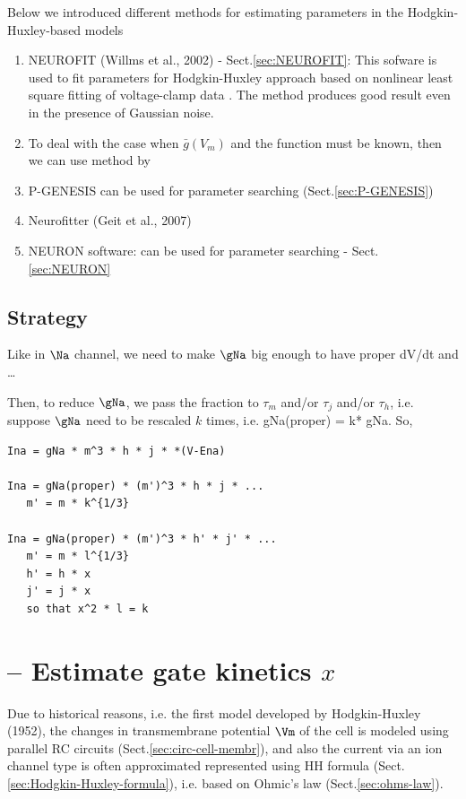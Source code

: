 Below we introduced different methods for estimating parameters in the
Hodgkin-Huxley-based models
\begin{enumerate}
  \item NEUROFIT (Willms et al., 2002) - Sect.\ref{sec:NEUROFIT}: This sofware
  is used to fit parameters for Hodgkin-Huxley approach based on nonlinear least square fitting of
  voltage-clamp data \citep{willms2002}. The method produces good result even in
  the presence of Gaussian noise.

  \item To deal with the case when $\bar{g}(V_m)$ and the function must be
 known, then we can use method by \citep{wang2004pe}

 \item P-GENESIS can be used for parameter searching (Sect.\ref{sec:P-GENESIS})

 \item Neurofitter (Geit et al., 2007)

 \item NEURON software: can be used for parameter searching -
 Sect.\ref{sec:NEURON}
\end{enumerate}


\subsection{Strategy}

Like in $\Na$ channel, we need to make $\gNa$ big enough to have proper dV/dt
and \ldots

Then, to reduce $\gNa$, we pass the fraction to $\tau_m$ and/or $\tau_j$ and/or
$\tau_h$, i.e. suppose $\gNa$ need to be rescaled $k$ times, i.e. gNa(proper) =
k* gNa. So,

\begin{verbatim}
Ina = gNa * m^3 * h * j * *(V-Ena)

Ina = gNa(proper) * (m')^3 * h * j * ...
   m' = m * k^{1/3}

Ina = gNa(proper) * (m')^3 * h' * j' * ...
   m' = m * l^{1/3}
   h' = h * x
   j' = j * x
   so that x^2 * l = k
\end{verbatim}


\section{-- Estimate gate kinetics $x$}
\label{sec:fit-activation-HH}

Due to historical reasons, i.e. the first model developed by
Hodgkin-Huxley (1952), the changes in transmembrane potential $\Vm$ of the cell
is modeled using parallel RC circuits (Sect.\ref{sec:circ-cell-membr}), and also
the current via an ion channel type is often
approximated represented using HH formula
(Sect.\ref{sec:Hodgkin-Huxley-formula}), i.e. based on Ohmic's law
(Sect.\ref{sec:ohms-law}).

